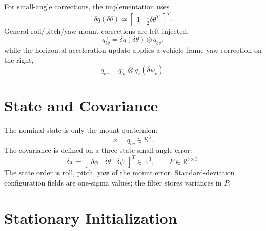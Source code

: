 \documentclass[11pt]{article}
\newcommand{\R}{\mathbb{R}}
\newcommand{\T}{^{T}}
\newcommand{\dq}{\delta q}
\begin{document}
For small-angle corrections, the implementation uses
\begin{equation}
  \dq(\delta\theta) \simeq
  \begin{bmatrix}1 & \frac{1}{2}\delta\theta\T\end{bmatrix}\T .
\end{equation}
General roll/pitch/yaw mount corrections are left-injected,
\begin{equation}
  q_{bv}^{+}=\dq(\delta\theta)\otimes q_{bv}^{-},
\end{equation}
while the horizontal acceleration update applies a vehicle-frame yaw correction on
the right,
\begin{equation}
  q_{bv}^{+}=q_{bv}^{-}\otimes q_z(\delta\psi_v).
\end{equation}

\section{State and Covariance}

The nominal state is only the mount quaternion:
\begin{equation}
  x = q_{bv}\in \mathbb{S}^{3}.
\end{equation}
The covariance is defined on a three-state small-angle error:
\begin{equation}
  \delta x =
  \begin{bmatrix}
  \delta\phi & \delta\theta & \delta\psi
  \end{bmatrix}\T \in \R^3,
  \qquad
  P\in\R^{3\times 3}.
\end{equation}
The state order is roll, pitch, yaw of the mount error. Standard-deviation
configuration fields are one-sigma values; the filter stores variances in \(P\).

\section{Stationary Initialization}
\end{document}
